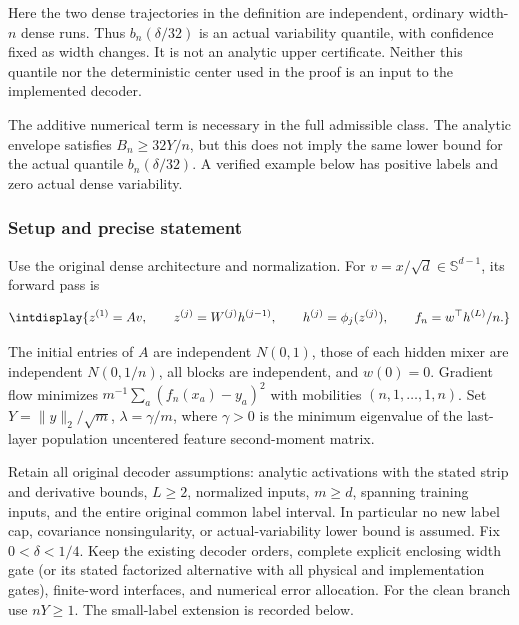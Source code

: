 
Here the two dense trajectories in the definition are independent, ordinary width-\(n\) dense runs. Thus \(b_n(\delta/32)\) is an actual variability quantile, with confidence fixed as width changes. It is not an analytic upper certificate. Neither this quantile nor the deterministic center used in the proof is an input to the implemented decoder.



The additive numerical term is necessary in the full admissible class. The analytic envelope satisfies \(B_n\ge32Y/n\), but this does not imply the same lower bound for the actual quantile \(b_n(\delta/32)\). A verified example below has positive labels and zero actual dense variability.


\subsubsection{Setup and precise statement}



Use the original dense architecture and normalization. For \(v=x/\sqrt d\in\mathbb S^{d-1}\), its forward pass is


\begingroup\renewcommand{\theHequation}{intdisplay.801}
\begin{equation*}
\intdisplay{
z^{(1)}=Av,\qquad z^{(j)}=W^{(j)}h^{(j-1)},\qquad
h^{(j)}=\phi_j(z^{(j)}),\qquad f_n=w^\top h^{(L)}/n.
}
\end{equation*}
\endgroup


The initial entries of \(A\) are independent \(N(0,\allowbreak 1)\), those of each hidden mixer are independent \(N(0,\allowbreak 1/n)\), all blocks are independent, and \(w(0)=0\). Gradient flow minimizes \(m^{-1}\sum_a(f_n(x_a)-y_a)^2\) with mobilities \((n,\allowbreak 1,\allowbreak \ldots,\allowbreak 1,\allowbreak n)\). Set \(Y=\|y\|_2/\sqrt m\), \(\lambda=\gamma/m\), where \(\gamma>0\) is the minimum eigenvalue of the last-layer population uncentered feature second-moment matrix.



Retain all original decoder assumptions: analytic activations with the stated strip and derivative bounds, \(L\ge2\), normalized inputs, \(m\ge d\), spanning training inputs, and the entire original common label interval. In particular no new label cap, covariance nonsingularity, or actual-variability lower bound is assumed. Fix \(0<\delta<1/4\). Keep the existing decoder orders, complete explicit enclosing width gate (or its stated factorized alternative with all physical and implementation gates), finite-word interfaces, and numerical error allocation. For the clean branch use \(nY\ge1\). The small-label extension is recorded below.


